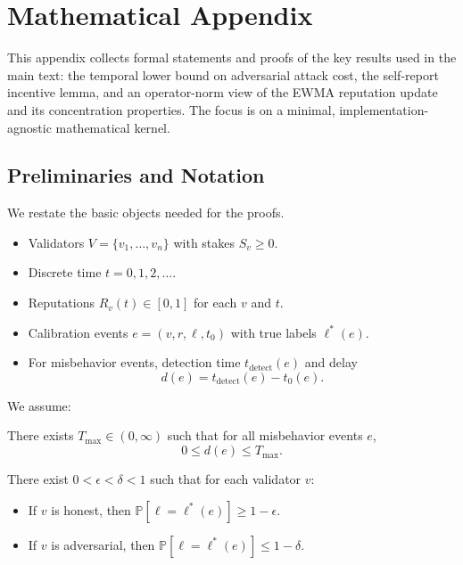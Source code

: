 \documentclass[11pt]{article}
\begin{document}
\appendix
\section{Mathematical Appendix}
\label{app:math}

This appendix collects formal statements and proofs of the key results used in the main text: the temporal lower bound on adversarial attack cost, the self-report incentive lemma, and an operator-norm view of the EWMA reputation update and its concentration properties. The focus is on a minimal, implementation-agnostic mathematical kernel.

\subsection{Preliminaries and Notation}

We restate the basic objects needed for the proofs.

\begin{itemize}[leftmargin=*]
  \item Validators \(V = \{v_1,\dots,v_n\}\) with stakes \(S_v \ge 0\).
  \item Discrete time \(t = 0,1,2,\dots\).
  \item Reputations \(R_v(t) \in [0,1]\) for each \(v\) and \(t\).
  \item Calibration events \(e = (v, r, \ell, t_0)\) with true labels \(\ell^*(e)\).
  \item For misbehavior events, detection time \(t_{\mathrm{detect}}(e)\) and delay
  \[
  d(e) = t_{\mathrm{detect}}(e) - t_0(e).
  \]
\end{itemize}

We assume:

\begin{assumption}
\label{ass:bounded-delay-app}
There exists \(T_{\max} \in (0,\infty)\) such that for all misbehavior events \(e\),
\[
0 \le d(e) \le T_{\max}.
\]
\end{assumption}

\begin{assumption}
\label{ass:types-app}
There exist \(0 < \epsilon < \delta < 1\) such that for each validator \(v\):
\begin{itemize}[leftmargin=*]
  \item If \(v\) is honest, then \(\mathbb{P}[\ell = \ell^*(e)] \ge 1 - \epsilon\).
  \item If \(v\) is adversarial, then \(\mathbb{P}[\ell = \ell^*(e)] \le 1 - \delta\).
\end{itemize}
\end{assumption}
\end{document}
